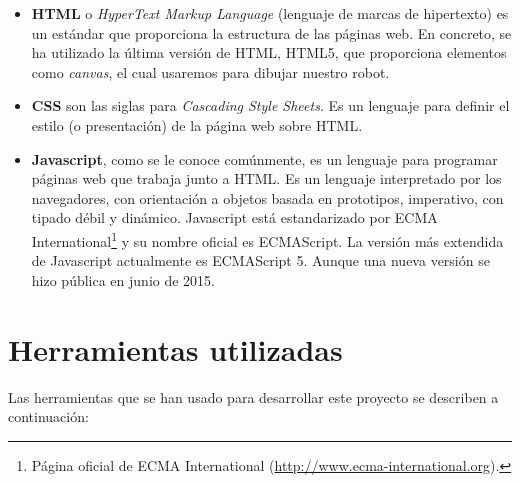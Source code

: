 \begin{itemize}
	
	\item \textbf{HTML} o \emph{HyperText Markup Language} (lenguaje de marcas de hipertexto)	es un estándar que proporciona la estructura de las páginas web. En concreto, se ha utilizado la última versión de HTML, HTML5, que proporciona elementos como \emph{canvas}, el cual usaremos para dibujar nuestro robot.
	
	\item \textbf{CSS} son las siglas para \emph{Cascading Style Sheets}. Es un lenguaje para definir el estilo (o presentación) de la página web sobre HTML.
	
	\item \textbf{Javascript}, como se le conoce comúnmente, es un lenguaje para programar páginas web que trabaja junto a HTML. Es un lenguaje interpretado por los navegadores, con orientación a objetos basada en prototipos, imperativo, con tipado débil y dinámico. Javascript está estandarizado por ECMA International\footnote{Página oficial de ECMA International (\url{http://www.ecma-international.org}).} y su nombre oficial es ECMAScript. La versión más extendida de Javascript actualmente es ECMAScript 5. Aunque una nueva versión se hizo pública en junio de 2015\cite{ecmascript6}. 
	
\end{itemize}



\section{Herramientas utilizadas}
\label{sec:herramientas}

Las herramientas que se han usado para desarrollar este proyecto se describen a continuación:

